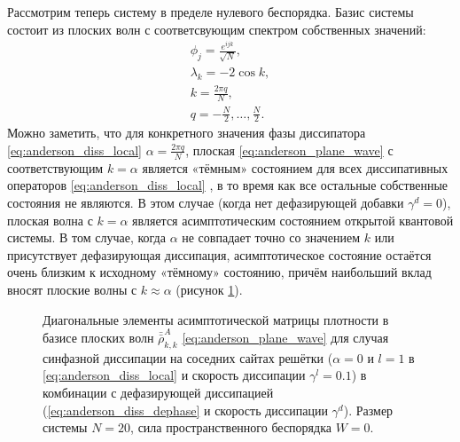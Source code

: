 Рассмотрим теперь систему в пределе нулевого беспорядка. Базис системы состоит из плоских волн с соответсвующим спектром собственных значений:
\begin{equation}
\label{eq:anderson_plane_wave}
\begin{gathered}
\phi_j = \frac{e^{i j k}}{\sqrt{N}}, \\
\lambda_k = -2 \cos{k}, \\
k = \frac{2 \pi q}{N}, \\
q = -\frac{N}{2}, \ldots, \frac{N}{2}.
\end{gathered}
\end{equation}
Можно заметить, что для конкретного значения фазы диссипатора \cref{eq:anderson_diss_local} \(\alpha = \frac{2 \pi q}{N}\), плоская  \cref{eq:anderson_plane_wave} с соответствующим \(k=\alpha\) является «тёмным» состоянием для всех диссипативных операторов \cref{eq:anderson_diss_local} \cite{Diehl2008, Kraus2008}, в то время как все остальные собственные состояния не являются.
В этом случае (когда нет дефазирующей добавки \(\gamma^d = 0\)), плоская волна с \(k = \alpha\) является асимптотическим состоянием открытой квантовой системы. 
В том случае, когда \(\alpha\) не совпадает точно со значением \(k\) или присутствует дефазирующая диссипация, асимптотическое состояние остаётся очень близким к исходному «тёмному» состоянию, причём наибольший вклад вносят плоские волны с \(k \approx \alpha\) (рисунок \cref{fig:anderson_rho_nn_zero_disorder}).
\begin{figure}[ht]
	\caption{
		Диагональные элементы асимптотической матрицы плотности в базисе плоских волн \(\bar{\bar{\rho}}^A_{k,k}\) \cref{eq:anderson_plane_wave} для случая синфазной диссипации на соседних сайтах решётки (\(\alpha=0\) и \(l=1\) в \cref{eq:anderson_diss_local} и скорость диссипации \(\gamma^l=0.1\)) в комбинации с дефазирующей диссипацией (\cref{eq:anderson_diss_dephase} и скорость диссипации \(\gamma^d\)). Размер системы \(N=20\), сила пространственного беспорядка \(W=0\).
	}
	\label{fig:anderson_rho_nn_zero_disorder}
\end{figure}

